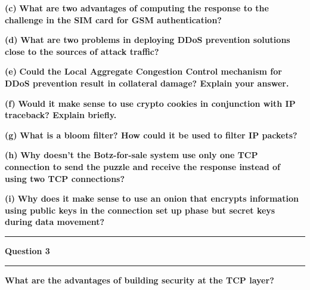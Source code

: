 \documentclass[11pt]{article}
\newcommand\question[2]{\vspace{.25in}\hrule\textbf{#1}\vspace{.5em}\hrule\vspace{.10in}}
\renewcommand\part[1]{\vspace{.10in}\textbf{(#1)}}
\begin{document}
\part{c} \textbf{What are two advantages of computing the response to the challenge in the SIM card for GSM authentication?}

\part{d} \textbf{What are two problems in deploying DDoS prevention solutions close to the sources of attack traffic?}

\part{e} \textbf{Could the Local Aggregate Congestion Control mechanism for DDoS prevention result in collateral damage? Explain your answer.}

\part{f} \textbf{Would it make sense to use crypto cookies in conjunction with IP traceback? Explain briefly.}

\part{g} \textbf{What is a bloom filter? How could it be used to filter IP packets?}

\part{h} \textbf{Why doesn't the Botz-for-sale system use only one TCP connection to send the puzzle and receive the response instead of using two TCP connections?}

\part{i} \textbf{Why does it make sense to use an onion that encrypts information using public keys in the connection set up phase but secret keys during data movement?}

\question{Question 3}

\part{1} \textbf{What are the advantages of building security at the TCP layer?}
\end{document}
